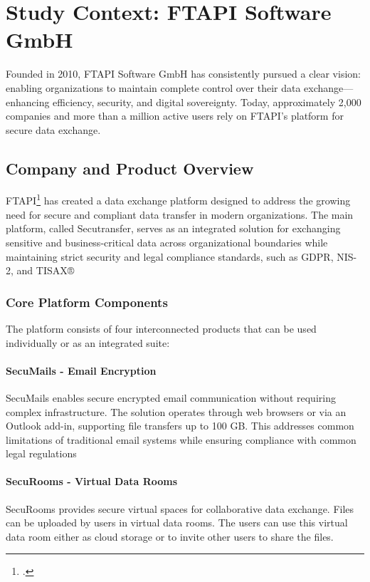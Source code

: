 \chapter{Study Context: FTAPI Software GmbH}\label{chapter:ftapi}
Founded in 2010, FTAPI Software GmbH has consistently pursued a clear vision: enabling organizations to maintain complete control over their data exchange—enhancing efficiency, security, and digital sovereignty. Today, approximately 2,000 companies and more than a million active users rely on FTAPI's platform for secure data exchange.


\section{Company and Product Overview}
FTAPI\footcite{ftapi2025} has created a data exchange platform designed to address the growing need for secure and compliant data transfer in modern organizations. The main platform, called Secutransfer, serves as an integrated solution for exchanging sensitive and business-critical data across organizational boundaries while maintaining strict security and legal compliance standards, such as GDPR, NIS-2, and TISAX® 

\subsection{Core Platform Components}
The platform consists of four interconnected products that can be used individually or as an integrated suite:

\subsubsection{SecuMails - Email Encryption}\label{sec:secumails}
SecuMails enables secure encrypted email communication without requiring complex infrastructure. The solution operates through web browsers or via an Outlook add-in, supporting file transfers up to 100 GB. This addresses common limitations of traditional email systems while ensuring compliance with common legal regulations

\subsubsection{SecuRooms - Virtual Data Rooms}\label{sec:securooms}
SecuRooms provides secure virtual spaces for collaborative data exchange. Files can be uploaded by users in virtual data rooms. The users can use this virtual data room either as cloud storage or to invite other users to share the files. 

